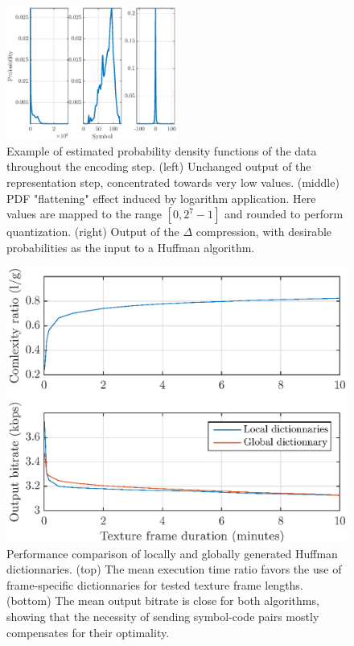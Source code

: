 \documentclass[final,3p,times,twocolumn]{elsarticle}
\begin{document}
\begin{figure}[htbp]
	\centering
		\includegraphics[width=0.5\textwidth]{pdf.eps}
	\caption{Example of estimated probability density functions of the data throughout the encoding step. (left) Unchanged output of the representation step, concentrated towards very low values. (middle) PDF "flattening" effect induced by logarithm application. Here values are mapped to the range $[0, 2^7-1]$ and rounded to perform quantization. (right) Output of the $\Delta$ compression, with desirable probabilities as the input to a Huffman algorithm.}
	\label{fig:pdf}
\end{figure}

\begin{figure}[htbp]
	\centering
		\includegraphics[width=\columnwidth]{dict_comp.eps}
	\caption{Performance comparison of locally and globally generated Huffman dictionnaries. (top) The mean execution time ratio favors the use of frame-specific dictionnaries for tested texture frame lengths. (bottom) The mean output bitrate is close for both algorithms, showing that the necessity of sending symbol-code pairs mostly compensates for their optimality.}
	\label{fig:dict_comp}
\end{figure}
\end{document}
